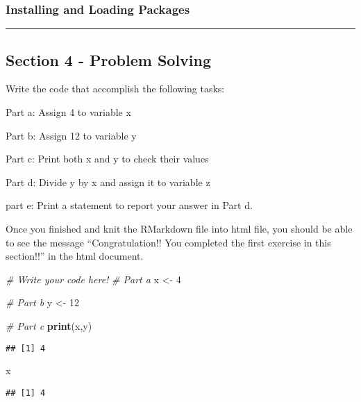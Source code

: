 \documentclass[
]{article}
\newenvironment{Shaded}{\begin{snugshade}}{\end{snugshade}}
\newcommand{\CommentTok}[1]{\textcolor[rgb]{0.56,0.35,0.01}{\textit{#1}}}
\newcommand{\DecValTok}[1]{\textcolor[rgb]{0.00,0.00,0.81}{#1}}
\newcommand{\FunctionTok}[1]{\textcolor[rgb]{0.13,0.29,0.53}{\textbf{#1}}}
\newcommand{\NormalTok}[1]{#1}
\newcommand{\OtherTok}[1]{\textcolor[rgb]{0.56,0.35,0.01}{#1}}
\begin{document}
\subsubsection{Installing and Loading
Packages}\label{installing-and-loading-packages}

\begin{center}\rule{0.5\linewidth}{0.5pt}\end{center}

\subsection{Section 4 - Problem
Solving}\label{section-4---problem-solving}

Write the code that accomplish the following tasks:

Part a: Assign 4 to variable x

Part b: Assign 12 to variable y

Part c: Print both x and y to check their values

Part d: Divide y by x and assign it to variable z

part e: Print a statement to report your answer in Part d.

Once you finished and knit the RMarkdown file into html file, you should
be able to see the message ``Congratulation!! You completed the first
exercise in this section!!'' in the html document.

\begin{Shaded}
\begin{Highlighting}[]
\CommentTok{\# Write your code here!}
\CommentTok{\# Part a}
\NormalTok{x }\OtherTok{\textless{}{-}} \DecValTok{4}

\CommentTok{\# Part b}
\NormalTok{y }\OtherTok{\textless{}{-}} \DecValTok{12}

\CommentTok{\# Part c}
\FunctionTok{print}\NormalTok{(x,y)}
\end{Highlighting}
\end{Shaded}

\begin{verbatim}
## [1] 4
\end{verbatim}

\begin{Shaded}
\begin{Highlighting}[]
\NormalTok{x}
\end{Highlighting}
\end{Shaded}

\begin{verbatim}
## [1] 4
\end{verbatim}
\end{document}
